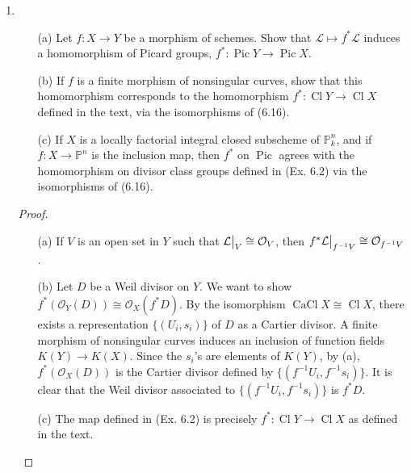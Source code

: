 \documentclass{article}
\newcommand{\fO}{\mathcal{O}}
\newcommand{\fL}{\mathcal{L}}
\newcommand{\PP}{\mathbb{P}}
\DeclareMathOperator{\pic}{Pic}
\DeclareMathOperator{\cacl}{CaCl}
\DeclareMathOperator{\cl}{Cl}
\newcommand\restr[2]{{%
  \left.\kern-\nulldelimiterspace %
  #1 %
  \vphantom{\big|} %
  \right|_{#2} %
}}
\begin{document}
\begin{enumerate} [label=\textbf{\arabic*.}, leftmargin=0em]
\item
\begin{itemize}
    \item[(a)] Let $f : X \to Y$ be a morphism of schemes. Show that $\fL \mapsto f^* \fL$ induces a homomorphism of Picard groups, $f^* : \pic Y \to \pic X$.
    \item[(b)] If $f$ is a finite morphism of nonsingular curves, show that this homomorphism corresponds to the homomorphism $f^* : \cl Y \to \cl X$ defined in the text, via the isomorphisms of (6.16).
    \item[(c)] If $X$ is a locally factorial integral closed subscheme of $\PP_k^n$, and if $f : X \to \PP^n$ is the inclusion map, then $f^*$ on $\pic$ agrees with the homomorphism on divisor class groups defined in (Ex. 6.2) via the isomorphisms of (6.16).
\end{itemize}

\begin{proof} $ $ \vspace{0pt}
\begin{itemize} [leftmargin=0cm]
\item[(a)] If $V$ is an open set in $Y$ such that $\restr{\fL}{V} \cong \fO_V$, then $\restr{f^*\fL}{f^{-1}V} \cong \fO_{f^{-1}V}$.

\item[(b)] Let $D$ be a Weil divisor on $Y$. We want to show $f^* (\fO_Y(D)) \cong \fO_X(f^*D)$. By the isomorphism $\cacl{X} \cong \cl{X}$, there exists a representation $\{ (U_i, s_i) \}$ of $D$ as a Cartier divisor. A finite morphism of nonsingular curves induces an inclusion of function fields $K(Y) \to K(X)$. Since the $s_i$'s are elements of $K(Y)$, by (a), $f^*(\fO_X(D))$ is the Cartier divisor defined by $\{ (f^{-1}U_i, f^{-1}s_i)\}$. It is clear that the Weil divisor associated to $\{ (f^{-1}U_i, f^{-1}s_i)\}$ is $f^* D$. 

\item[(c)] The map defined in (Ex. 6.2) is precisely $f^* : \cl{Y} \to \cl{X}$ as defined in the text.

\end{itemize} 
\end{proof}


\end{enumerate}
\end{document}
